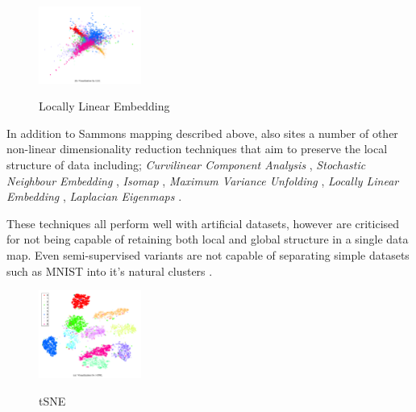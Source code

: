 \documentclass[a4paper,11pt,titlepage]{article}
\begin{document}
 	\begin{figure}[H]
    			\centering	
			{{\includegraphics[width=0.3\textwidth]
    				{img/hinton_lle.png} 
    			}}%
    			\caption{Locally Linear Embedding}%
    		\label{fig:3nn}
	\end{figure}	 
 		
		\par 
		In addition to Sammons mapping described above, \cite{VanderMaaten2009} also sites a number of other non-linear dimensionality reduction techniques that aim to preserve the local structure of data including; \textit{Curvilinear Component Analysis} \cite{Demartines1995}, \textit{Stochastic Neighbour Embedding} \cite{Hinton2002}, \textit{Isomap} \cite{Tenenbaum2000}, \textit{Maximum Variance Unfolding} \cite{Weinberger2004}, \textit{Locally Linear Embedding} \cite{Roweis2000}, \textit{Laplacian Eigenmaps} \cite{Belkin2002}.

		\par 
		These techniques all perform well with artificial datasets, however are criticised for not being capable of retaining both local and global structure in a single data map. Even semi-supervised variants are not capable of separating simple datasets such as MNIST into it's natural clusters \cite{Song2007}. 
		\par 

	\begin{figure}[H]
    			\centering	
			{{\includegraphics[width=0.3\textwidth]
    				{img/hinton_tsne.png} 
    			}}%
    			\caption{tSNE}%
    		\label{fig:3nn}
	\end{figure}	  		
 		
\end{document}
